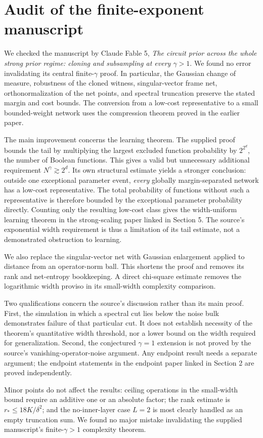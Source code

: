 \section{Audit of the finite-exponent manuscript}
\label{sec:fable-audit}

We checked the manuscript by Claude Fable 5, \emph{The circuit
prior across the whole strong prior regime: cloning and subsampling at
every $\gamma>1$}. We found no error invalidating its central finite-$\gamma$ proof. In
particular, the Gaussian change of measure, robustness of the cloned
witness, singular-vector frame net, orthonormalization of the net points,
and spectral truncation preserve the stated margin and cost bounds.
The conversion from a low-cost representative to a small bounded-weight
network uses the compression theorem proved in the earlier paper.

The main improvement concerns the learning theorem. The supplied proof
bounds the tail by multiplying the largest excluded function probability
by $2^{2^d}$, the number of Boolean functions. This gives a valid but
unnecessary additional requirement $N^\gamma\gtrsim2^d$. Its own
structural estimate yields a stronger conclusion: outside one exceptional
parameter event, \emph{every} globally margin-separated network has a
low-cost representative. The total probability of functions without such
a representative is therefore bounded by the exceptional parameter
probability directly. Counting only the resulting low-cost class gives
the width-uniform learning theorem in the strong-scaling paper linked in Section 5. The source's
exponential width requirement is thus a limitation of its tail estimate,
not a demonstrated obstruction to learning.

We also replace the singular-vector net with Gaussian enlargement
applied to distance from an operator-norm ball. This shortens the proof
and removes its rank and net-entropy bookkeeping. A direct chi-square
estimate removes the logarithmic width proviso in its small-width
complexity comparison.

Two qualifications concern the source's discussion rather than its main
proof. First, the simulation in which a spectral cut lies below the noise
bulk demonstrates failure of that particular cut. It does not establish
necessity of the theorem's quantitative width threshold, nor a lower
bound on the width required for generalization. Second, the conjectured
$\gamma=1$ extension is not proved by the source's vanishing-operator-noise
argument. Any endpoint result needs a separate argument; the endpoint
statements in the endpoint paper linked in Section 2 are proved independently.

Minor points do not affect the results: ceiling operations in the
small-width bound require an additive one or an absolute factor; the
rank estimate is $r_*\le18K/\delta^2$; and the no-inner-layer case $L=2$
is most clearly handled as an empty truncation sum. We found no major
mistake invalidating the supplied manuscript's finite-$\gamma>1$
complexity theorem.
